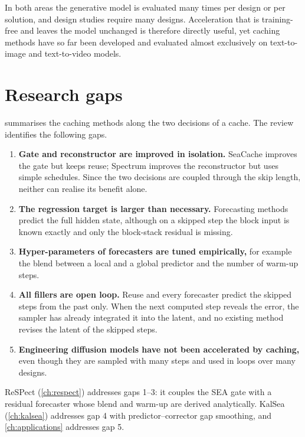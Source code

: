 In both areas the generative model is evaluated many times per design or per solution, and design studies require many designs. Acceleration that is training-free and leaves the model unchanged is therefore directly useful, yet caching methods have so far been developed and evaluated almost exclusively on text-to-image and text-to-video models.

\section{Research gaps}\label{sec:lit-gaps}

 summarises the caching methods along the two decisions of a cache. The review identifies the following gaps.
\begin{enumerate}
  \item \textbf{Gate and reconstructor are improved in isolation.} SeaCache improves the gate but keeps reuse; Spectrum improves the reconstructor but uses simple schedules. Since the two decisions are coupled through the skip length, neither can realise its benefit alone.
  \item \textbf{The regression target is larger than necessary.} Forecasting methods predict the full hidden state, although on a skipped step the block input is known exactly and only the block-stack residual is missing.
  \item \textbf{Hyper-parameters of forecasters are tuned empirically,} for example the blend between a local and a global predictor and the number of warm-up steps.
  \item \textbf{All fillers are open loop.} Reuse and every forecaster predict the skipped steps from the past only. When the next computed step reveals the error, the sampler has already integrated it into the latent, and no existing method revises the latent of the skipped steps.
  \item \textbf{Engineering diffusion models have not been accelerated by caching,} even though they are sampled with many steps and used in loops over many designs.
\end{enumerate}
ReSPect (\cref{ch:respect}) addresses gaps 1--3: it couples the SEA gate with a residual forecaster whose blend and warm-up are derived analytically. KalSea (\cref{ch:kalsea}) addresses gap 4 with predictor--corrector gap smoothing, and \cref{ch:applications} addresses gap 5.

